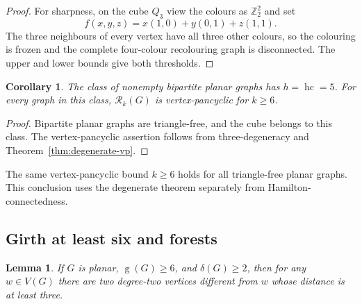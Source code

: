 \documentclass[11pt]{article}
\newtheorem{lemma}[theorem]{Lemma}
\newtheorem{corollary}[theorem]{Corollary}
\theoremstyle{remark}
\newcommand{\Rk}{\mathcal R_k}
\newcommand{\hc}{\operatorname{hc}}
\newcommand{\girth}{\operatorname{g}}
\numberwithin{equation}{section}
\numberwithin{table}{section}
\begin{document}
\begin{proof}
For sharpness, on the cube $Q_3$ view the colours as
$\mathbb Z_2^2$ and set
\[
 f(x,y,z)=x(1,0)+y(0,1)+z(1,1).
\]
The three neighbours of every vertex have all three other colours,
so the colouring is frozen and the complete four-colour recolouring
graph is disconnected.  The upper and lower bounds give both thresholds.
\end{proof}

\begin{corollary}
The class of nonempty bipartite planar graphs has $h=\hc=5$.
For every graph in this class, $\Rk(G)$ is vertex-pancyclic for
$k\ge6$.
\end{corollary}

\begin{proof}
Bipartite planar graphs are triangle-free, and the cube belongs to this
class.  The vertex-pancyclic assertion follows from three-degeneracy and
Theorem~\ref{thm:degenerate-vp}.
\end{proof}

The same vertex-pancyclic bound $k\ge6$ holds for all triangle-free
planar graphs.  This conclusion uses the degenerate theorem separately
from Hamilton-connectedness.

\subsection{Girth at least six and forests}

\begin{lemma}
\label{lem:marked-two}
If $G$ is planar, $\girth(G)\ge6$, and $\delta(G)\ge2$, then for
any $w\in V(G)$ there are two degree-two vertices different from
$w$ whose distance is at least three.
\end{lemma}
\end{document}
